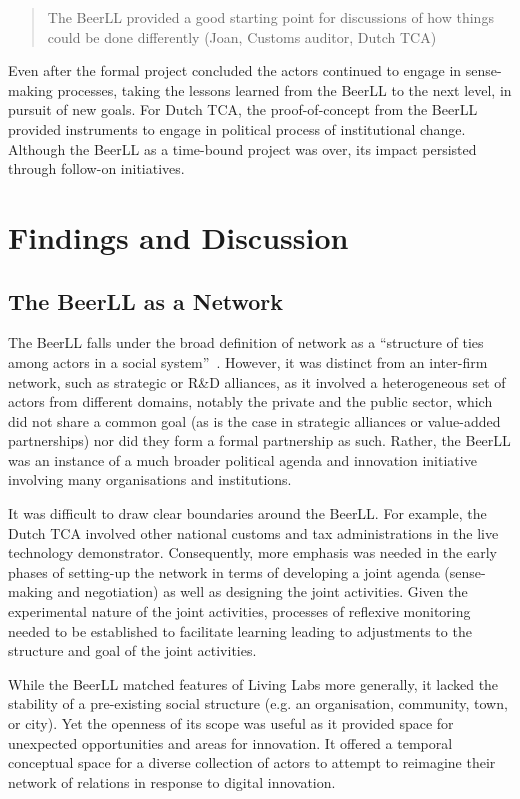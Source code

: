 \documentclass[graybox]{styles/svmult}
\begin{document}
\blockquote{The BeerLL provided a good starting point for discussions of how things could be done differently (Joan, Customs auditor, Dutch TCA)}

Even after the formal project concluded the actors continued to engage in sense-making processes, taking the lessons learned from the BeerLL to the next level, in pursuit of new goals. For Dutch TCA, the proof-of-concept from the BeerLL provided instruments to engage in political process of institutional change. Although the BeerLL as a time-bound project was over, its impact persisted through follow-on initiatives. 


\section{Findings and Discussion}
\subsection{The BeerLL as a Network}
The BeerLL falls under the broad definition of network as a \enquote{structure of ties among actors in a social system}~\citep{nohria1994networks}. However, it was distinct from an inter-firm network, such as strategic or R\&D alliances, as it involved a heterogeneous set of actors from different domains, notably the private and the public sector, which did not share a common goal (as is the case in strategic alliances or value-added partnerships) nor did they form a formal partnership as such. Rather, the BeerLL was an instance of a much broader political agenda and innovation initiative involving many organisations and institutions. 

It was difficult to draw clear boundaries around the BeerLL. For example, the Dutch TCA involved other national customs and tax administrations in the live technology demonstrator. Consequently, more emphasis was needed in the early phases of setting-up the network in terms of developing a joint agenda (sense-making and negotiation) as well as designing the joint activities. Given the experimental nature of the joint activities, processes of reflexive monitoring needed to be established to facilitate learning leading to adjustments to the structure and goal of the joint activities. 

While the BeerLL matched features of Living Labs more generally, it lacked the stability of a pre-existing social structure (e.g. an organisation, community, town, or city). 
Yet the openness of its scope was useful as it provided space for unexpected opportunities and areas for innovation. 
It offered a temporal conceptual space for a diverse collection of actors to attempt to reimagine their network of relations in response to digital innovation. 
\end{document}
